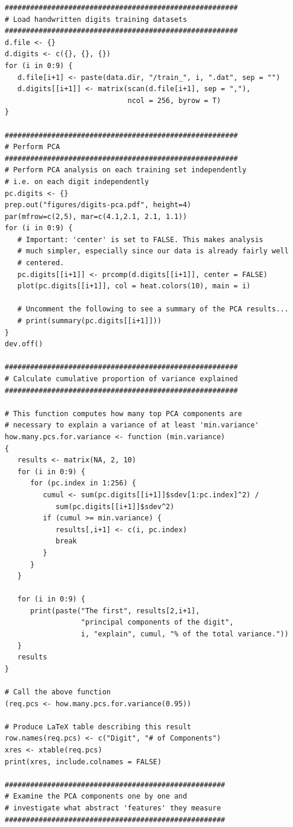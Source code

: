 \documentclass[12pt,article,oneside]{memoir}
\begin{document}
\begin{verbatim}
#######################################################
# Load handwritten digits training datasets
#######################################################
d.file <- {}
d.digits <- c({}, {}, {})
for (i in 0:9) {
   d.file[i+1] <- paste(data.dir, "/train_", i, ".dat", sep = "")
   d.digits[[i+1]] <- matrix(scan(d.file[i+1], sep = ","),
                             ncol = 256, byrow = T)
}

#######################################################
# Perform PCA
#######################################################
# Perform PCA analysis on each training set independently
# i.e. on each digit independently
pc.digits <- {}
prep.out("figures/digits-pca.pdf", height=4)
par(mfrow=c(2,5), mar=c(4.1,2.1, 2.1, 1.1))
for (i in 0:9) {
   # Important: 'center' is set to FALSE. This makes analysis
   # much simpler, especially since our data is already fairly well
   # centered.
   pc.digits[[i+1]] <- prcomp(d.digits[[i+1]], center = FALSE)
   plot(pc.digits[[i+1]], col = heat.colors(10), main = i)
   
   # Uncomment the following to see a summary of the PCA results...
   # print(summary(pc.digits[[i+1]]))
}
dev.off()

#######################################################
# Calculate cumulative proportion of variance explained
#######################################################

# This function computes how many top PCA components are
# necessary to explain a variance of at least 'min.variance'
how.many.pcs.for.variance <- function (min.variance)
{
   results <- matrix(NA, 2, 10)
   for (i in 0:9) {
      for (pc.index in 1:256) {
         cumul <- sum(pc.digits[[i+1]]$sdev[1:pc.index]^2) /
            sum(pc.digits[[i+1]]$sdev^2)
         if (cumul >= min.variance) {
            results[,i+1] <- c(i, pc.index)
            break
         }
      }
   }
   
   for (i in 0:9) {
      print(paste("The first", results[2,i+1],
                  "principal components of the digit",
                  i, "explain", cumul, "% of the total variance."))
   }
   results
}

# Call the above function
(req.pcs <- how.many.pcs.for.variance(0.95))

# Produce LaTeX table describing this result
row.names(req.pcs) <- c("Digit", "# of Components")
xres <- xtable(req.pcs)
print(xres, include.colnames = FALSE)

####################################################
# Examine the PCA components one by one and
# investigate what abstract 'features' they measure
####################################################


\end{verbatim}
\end{document}
